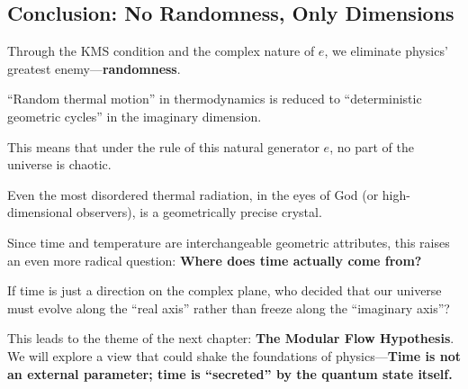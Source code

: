 \subsection{Conclusion: No Randomness, Only Dimensions}

Through the KMS condition and the complex nature of $e$, we eliminate physics' greatest enemy---\textbf{randomness}.

``Random thermal motion'' in thermodynamics is reduced to ``deterministic geometric cycles'' in the imaginary dimension.

This means that under the rule of this natural generator $e$, no part of the universe is chaotic.

Even the most disordered thermal radiation, in the eyes of God (or high-dimensional observers), is a geometrically precise crystal.

Since time and temperature are interchangeable geometric attributes, this raises an even more radical question: \textbf{Where does time actually come from?}

If time is just a direction on the complex plane, who decided that our universe must evolve along the ``real axis'' rather than freeze along the ``imaginary axis''?

This leads to the theme of the next chapter: \textbf{The Modular Flow Hypothesis}. We will explore a view that could shake the foundations of physics---\textbf{Time is not an external parameter; time is ``secreted'' by the quantum state itself.}

